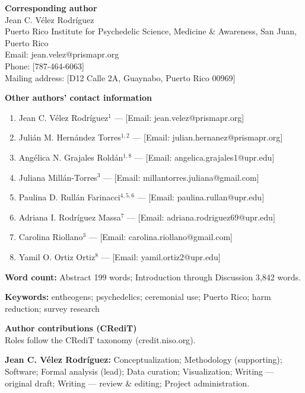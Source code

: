 \documentclass[12pt]{article}
\begin{document}
\vspace{1em}
\noindent\textbf{Corresponding author}\\
Jean C. V\'elez Rodr\'iguez\\
Puerto Rico Institute for Psychedelic Science, Medicine \& Awareness, San Juan, Puerto Rico\\
Email: jean.velez@prismapr.org\\
Phone: [787-464-6063]\\
Mailing address: [D12 Calle 2A, Guaynabo, Puerto Rico 00969]

\vspace{1em}
\noindent\textbf{Other authors' contact information}\\
\begin{enumerate}
\setlength{\itemsep}{0.3em}
\item Jean C. V\'elez Rodr\'iguez$^{1}$ --- [Email: jean.velez@prismapr.org]
\item Juli\'an M. Hern\'andez Torres$^{1,2}$ --- [Email: julian.hernanez@prismapr.org]
\item Ang\'elica N. Grajales Rold\'an$^{1,8}$ --- [Email: angelica.grajales1@upr.edu]
\item Juliana Mill\'an-Torres$^{3}$ --- [Email: millantorres.juliana@gmail.com]
\item Paulina D. Rull\'an Farinacci$^{4,5,6}$ --- [Email: paulina.rullan@upr.edu]
\item Adriana I. Rodr\'iguez Massa$^{7}$ --- [Email: adriana.rodriguez69@upr.edu]
\item Carolina Riollano$^{3}$ --- [Email: carolina.riollano@gmail.com]
\item Yamil O. Ortiz Ortiz$^{8}$ --- [Email: yamil.ortiz2@upr.edu]
\end{enumerate}

\vspace{1.5em}
\noindent\textbf{Word count:} Abstract 199 words; Introduction through Discussion
3{,}842 words.

\vspace{1em}
\noindent\textbf{Keywords:} entheogens; psychedelics; ceremonial use; Puerto Rico; harm reduction; survey research

\vspace{1.5em}
\noindent\textbf{Author contributions (CRediT)}\\
Roles follow the CRediT taxonomy (\textsf{credit.niso.org}).

\vspace{0.6em}
\noindent\textbf{Jean C. V\'elez Rodr\'iguez:} Conceptualization; Methodology (supporting); Software;
Formal analysis (lead); Data curation; Visualization; Writing --- original draft; Writing --- review \&
editing; Project administration.
\end{document}
